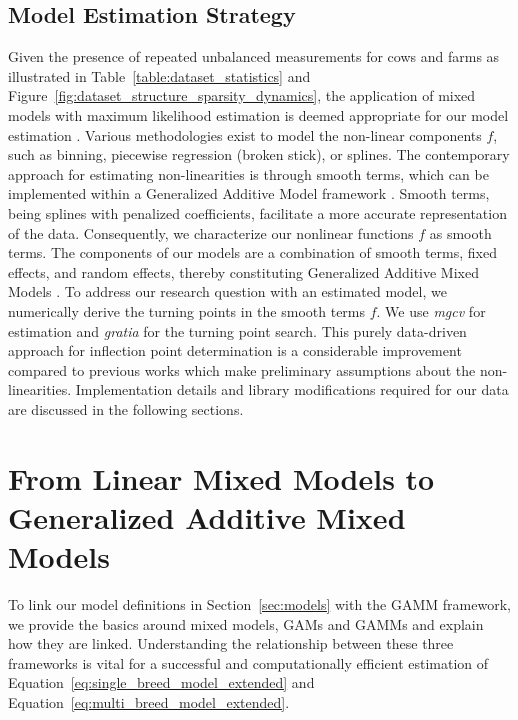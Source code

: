 \subsection{Model Estimation Strategy}\label{sec:estimation_strategy}
Given the presence of repeated unbalanced measurements for cows and farms as illustrated in Table~\ref{table:dataset_statistics} and Figure~\ref{fig:dataset_structure_sparsity_dynamics}, the application of mixed models with maximum likelihood estimation is deemed appropriate for our model estimation \cite[page 61 and 74]{wood_generalized_2017}. Various methodologies exist to model the non-linear components $f$, such as binning, piecewise regression (broken stick), or splines. The contemporary approach for estimating non-linearities is through smooth terms, which can be implemented within a Generalized Additive Model framework \citep[Chapter 5 and 6]{wood_generalized_2017}. Smooth terms, being splines with penalized coefficients, facilitate a more accurate representation of the data. Consequently, we characterize our nonlinear functions $f$ as smooth terms. The components of our models are a combination of smooth terms, fixed effects, and random effects, thereby constituting Generalized Additive Mixed Models \citep[page 288]{wood_generalized_2017}. To address our research question with an estimated model, we numerically derive the turning points in the smooth terms $f$. We use \textit{mgcv} \citep{mgcv1, mgcv2, mgcv4, wood_generalized_2017, wood_gamm4_2020} for estimation and \textit{gratia} \citep{gratia} for the turning point search. This purely data-driven approach for inflection point determination is a considerable improvement compared to previous works which make preliminary assumptions about the non-linearities. Implementation details and library modifications required for our data are discussed in the following sections.


\section{From Linear Mixed Models to Generalized Additive Mixed Models}\label{sec:mixed_to_gams}
To link our model definitions in Section~\ref{sec:models} with the GAMM framework, we provide the basics around mixed models, GAMs and GAMMs and explain how they are linked. Understanding the relationship between these three frameworks is vital for a successful and computationally efficient estimation of Equation~\ref{eq:single_breed_model_extended} and Equation~\ref{eq:multi_breed_model_extended}.

